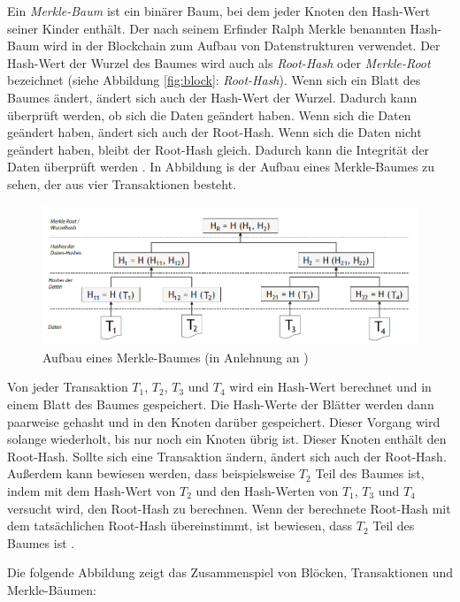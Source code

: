 Ein \textit{Merkle-Baum} ist ein binärer Baum, bei dem jeder Knoten den Hash-Wert seiner Kinder enthält. Der nach seinem Erfinder Ralph Merkle benannten Hash-Baum wird in der Blockchain zum Aufbau von Datenstrukturen verwendet. Der Hash-Wert der Wurzel des Baumes wird auch als \textit{Root-Hash} oder \textit{Merkle-Root} bezeichnet (siehe Abbildung \ref{fig:block}: \textit{Root-Hash}). Wenn sich ein Blatt des Baumes ändert, ändert sich auch der Hash-Wert der Wurzel. Dadurch kann überprüft werden, ob sich die Daten geändert haben. Wenn sich die Daten geändert haben, ändert sich auch der Root-Hash. Wenn sich die Daten nicht geändert haben, bleibt der Root-Hash gleich. Dadurch kann die Integrität der Daten überprüft werden \parencite[S. 7-8]{Fill_BlockchainGrundlagen}. In Abbildung is der Aufbau eines Merkle-Baumes zu sehen, der aus vier Transaktionen besteht.

\begin{figure}[H]
    \centering
    \includegraphics[width=0.9\linewidth]{images/merkle_tree_modified.png}
    \caption{Aufbau eines Merkle-Baumes (in Anlehnung an \cite[S. 8]{Fill_BlockchainGrundlagen})}
    \label{fig:merkle_tree}
\end{figure}

\noindent Von jeder Transaktion $T_{1}$, $T_{2}$, $T_{3}$ und $T_{4}$ wird ein Hash-Wert berechnet und in einem Blatt des Baumes gespeichert. Die Hash-Werte der Blätter werden dann paarweise gehasht und in den Knoten darüber gespeichert. Dieser Vorgang wird solange wiederholt, bis nur noch ein Knoten übrig ist. Dieser Knoten enthält den Root-Hash. Sollte sich eine Transaktion ändern, ändert sich auch der Root-Hash. Außerdem kann bewiesen werden, dass beispielsweise $T_{2}$ Teil des Baumes ist, indem mit dem Hash-Wert von $T_{2}$ und den Hash-Werten von $T_{1}$, $T_{3}$ und $T_{4}$ versucht wird, den Root-Hash zu berechnen. Wenn der berechnete Root-Hash mit dem tatsächlichen Root-Hash übereinstimmt, ist bewiesen, dass $T_{2}$ Teil des Baumes ist \parencite[S. 9]{Fill_BlockchainGrundlagen}.

Die folgende Abbildung zeigt das Zusammenspiel von Blöcken, Transaktionen und Merkle-Bäumen:

